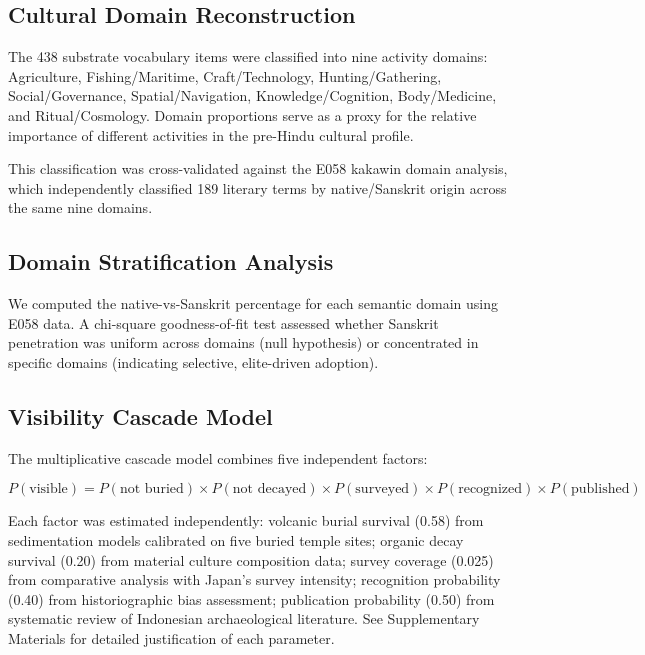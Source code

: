\documentclass[12pt,a4paper]{article}
\begin{document}
\subsection{Cultural Domain Reconstruction}

The 438 substrate vocabulary items were classified into nine activity domains: Agriculture, Fishing/Maritime, Craft/Technology, Hunting/Gathering, Social/Governance, Spatial/Navigation, Knowledge/Cognition, Body/Medicine, and Ritual/Cosmology. Domain proportions serve as a proxy for the relative importance of different activities in the pre-Hindu cultural profile.

This classification was cross-validated against the E058 kakawin domain analysis, which independently classified 189 literary terms by native/Sanskrit origin across the same nine domains.

\subsection{Domain Stratification Analysis}

We computed the native-vs-Sanskrit percentage for each semantic domain using E058 data. A chi-square goodness-of-fit test assessed whether Sanskrit penetration was uniform across domains (null hypothesis) or concentrated in specific domains (indicating selective, elite-driven adoption).

\subsection{Visibility Cascade Model}

The multiplicative cascade model combines five independent factors:

\begin{equation}
P(\text{visible}) = P(\text{not buried}) \times P(\text{not decayed}) \times P(\text{surveyed}) \times P(\text{recognized}) \times P(\text{published})
\end{equation}

Each factor was estimated independently: volcanic burial survival (0.58) from sedimentation models calibrated on five buried temple sites; organic decay survival (0.20) from material culture composition data; survey coverage (0.025) from comparative analysis with Japan's survey intensity; recognition probability (0.40) from historiographic bias assessment; publication probability (0.50) from systematic review of Indonesian archaeological literature. See Supplementary Materials for detailed justification of each parameter.
\end{document}
